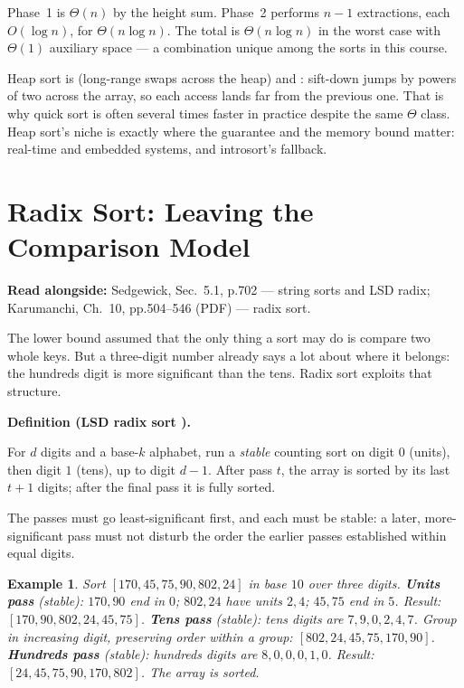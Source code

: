 \documentclass[11pt]{article}
\newtheorem{example}{Example}[section]
\newenvironment{definitionbox}[1]{%
  \par\noindent\textbf{Definition (#1).}\ \itshape
}{\par\vspace{0.3em}}
\begin{document}
Phase~1 is $\Theta(n)$ by the height sum. Phase~2 performs $n-1$ extractions, each $O(\log n)$, for $\Theta(n\log n)$. The total is $\Theta(n\log n)$ in the worst case with $\Theta(1)$ auxiliary space --- a combination unique among the sorts in this course.

Heap sort is  (long-range swaps across the heap) and : sift-down jumps by powers of two across the array, so each access lands far from the previous one. That is why quick sort is often several times faster in practice despite the same $\Theta$ class. Heap sort's niche is exactly where the guarantee and the memory bound matter: real-time and embedded systems, and introsort's fallback.

\section{Radix Sort: Leaving the Comparison Model}

\textbf{Read alongside:} Sedgewick, Sec.~5.1, p.702 --- string sorts and LSD radix; Karumanchi, Ch.~10, pp.504--546 (PDF) --- radix sort.

The lower bound assumed that the only thing a sort may do is compare two whole keys. But a three-digit number already says a lot about where it belongs: the hundreds digit is more significant than the tens. Radix sort exploits that structure.

\begin{definitionbox}{LSD radix sort \cite{Sedgewick2011_algorithms,Karumanchi2017_data_structures_algorithms_made_easy}}
For $d$ digits and a base-$k$ alphabet, run a \emph{stable} counting sort on digit $0$ (units), then digit $1$ (tens), up to digit $d-1$. After pass $t$, the array is sorted by its last $t+1$ digits; after the final pass it is fully sorted.
\end{definitionbox}

The passes must go least-significant first, and each must be stable: a later, more-significant pass must not disturb the order the earlier passes established within equal digits.

\begin{example}
Sort $[170,45,75,90,802,24]$ in base $10$ over three digits.
\textbf{Units pass} (stable): $170,90$ end in $0$; $802,24$ have units $2,4$; $45,75$ end in $5$. Result: $[170,90,802,24,45,75]$.
\textbf{Tens pass} (stable): tens digits are $7,9,0,2,4,7$. Group in increasing digit, preserving order within a group: $[802,24,45,75,170,90]$.
\textbf{Hundreds pass} (stable): hundreds digits are $8,0,0,0,1,0$. Result: $[24,45,75,90,170,802]$. The array is sorted.
\end{example}
\end{document}
